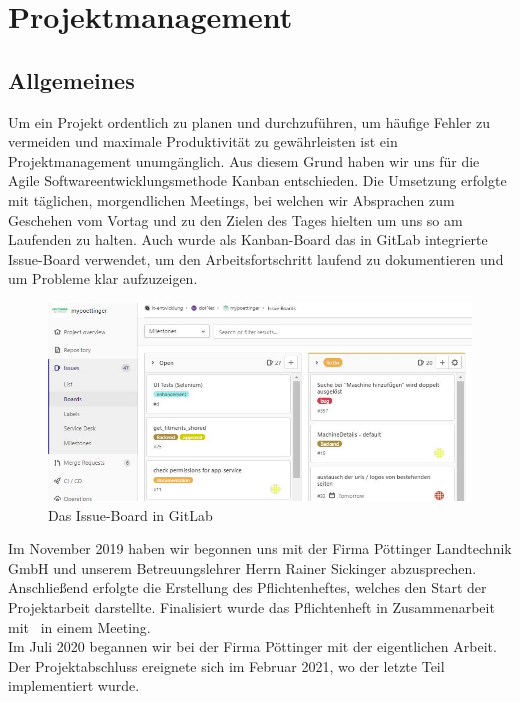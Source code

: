 \chapter{Projektmanagement}
\section{Allgemeines}
Um ein Projekt ordentlich zu planen und durchzuführen, um häufige Fehler zu vermeiden und maximale Produktivität zu gewährleisten ist ein Projektmanagement unumgänglich. Aus diesem Grund haben wir uns für die Agile Softwareentwicklungsmethode Kanban entschieden. Die Umsetzung erfolgte mit täglichen, morgendlichen Meetings, bei welchen wir Absprachen zum Geschehen vom Vortag und zu den Zielen des Tages hielten um uns so am Laufenden zu halten. Auch wurde als Kanban-Board das in GitLab integrierte Issue-Board verwendet, um den Arbeitsfortschritt laufend zu dokumentieren und um Probleme klar aufzuzeigen.\\

\begin{figure}[H]
	\centerline{
		\includegraphics[width=1\textwidth, frame]{./grafiken/GitLab_issue_Board.JPG}
	}
	\vskip0pt
	\caption{Das Issue-Board in GitLab}
\end{figure}


Im November 2019 haben wir begonnen uns mit der Firma Pöttinger Landtechnik GmbH und unserem Betreuungslehrer Herrn Rainer Sickinger abzusprechen.\\
Anschließend erfolgte die Erstellung des Pflichtenheftes, welches den Start der Projektarbeit darstellte. Finalisiert wurde das Pflichtenheft in Zusammenarbeit mit \ThPartnerPersonName \ in einem Meeting.\\
Im Juli 2020 begannen wir bei der Firma Pöttinger mit der eigentlichen Arbeit. Der Projektabschluss ereignete sich im Februar 2021, wo der letzte Teil implementiert wurde.

